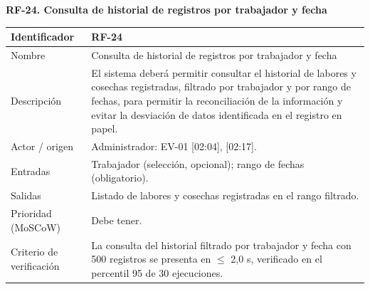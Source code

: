 \documentclass[12pt,a4paper]{article}
\begin{document}
\begin{minipage}{\linewidth}
\bigskip
\noindent\textbf{RF-24. Consulta de historial de registros por trabajador y fecha}
\label{tab:RF-24}

\begin{center}
\begin{tabular}{|p{3.5cm}|p{10.7cm}|}
\hline
Identificador & RF-24 \\
\hline
Nombre & Consulta de historial de registros por trabajador y fecha \\
\hline
Descripción & El sistema deberá permitir consultar el historial de labores y cosechas registradas, filtrado por trabajador y por rango de fechas, para permitir la reconciliación de la información y evitar la desviación de datos identificada en el registro en papel. \\
\hline
Actor / origen & Administrador: EV-01 [02:04], [02:17]. \\
\hline
Entradas & Trabajador (selección, opcional); rango de fechas (obligatorio). \\
\hline
Salidas & Listado de labores y cosechas registradas en el rango filtrado. \\
\hline
Prioridad (MoSCoW) & Debe tener. \\
\hline
Criterio de verificación & La consulta del historial filtrado por trabajador y fecha con 500 registros se presenta en $\leq$ 2,0 s, verificado en el percentil 95 de 30 ejecuciones. \\
\hline
\end{tabular}
\end{center}
\end{minipage}
\end{document}
